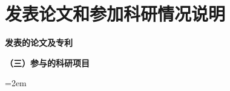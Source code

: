 
\chapter*{发表论文和参加科研情况说明}
\setlength{\parindent}{0em}
\textbf{发表的论文及专利}
\begin{publist}
\item 


\end{publist}


\vspace*{1em}
\textbf{（三）参与的科研项目}
\begin{publist}
\item 
\item 
\end{publist}
\vfill
{}\hangindent=2em\noindent

\setlength{\parindent}{2em}